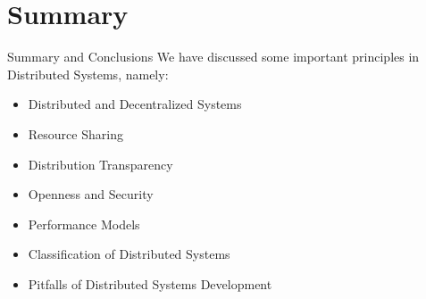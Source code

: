 \section{Summary}
\begin{frame}{Summary and Conclusions}
  We have discussed some important principles
  in Distributed Systems, namely:
  \begin{itemize}
    \item Distributed and Decentralized Systems
    \item Resource Sharing
    \item Distribution Transparency
    \item Openness and Security
    \item Performance Models
    \item Classification of Distributed Systems
    \item Pitfalls of Distributed Systems Development
  \end{itemize}
\end{frame}
